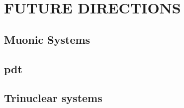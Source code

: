 \chapter{FUTURE DIRECTIONS\label{future}}

\section{Muonic Systems}

\section{pdt}

\section{Trinuclear systems}
